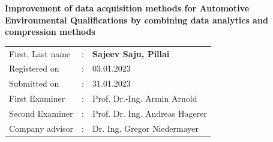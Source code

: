 \begin{titlepage}
\begin{center}
		\Large\textbf{Improvement of data acquisition methods for Automotive Environmental Qualifications by combining data analytics and
compression methods}	 \\ 

	\end{center}

	\vspace{3cm}
	
	
	\begin{tabular}{lll}
		First, Last name &: & \textbf{Sajeev Saju, Pillai}	\\ [3em]
		
		Registered on &:	& 03.01.2023	\\ [1em] %
		Submitted on &:	& 31.01.2023	\\ [3em] %
		
		First Examiner &: 	& Prof. Dr.-Ing. Armin Arnold	\\ [1em]
		Second Examiner &: 	& Prof. Dr. Ing. Andreas Hagerer	\\[3em]
		
		Company advisor &:	& Dr. Ing. Gregor Niedermayer \\ %
	\end{tabular}
	
\end{titlepage}

\restoregeometry